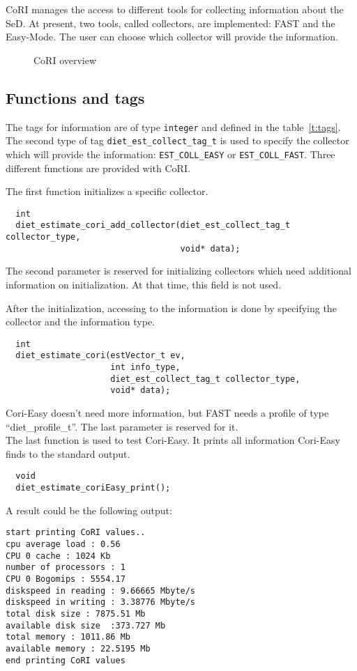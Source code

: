 CoRI manages the access to different tools for collecting information about the SeD. At present, two tools, called collectors, are implemented: FAST and the Easy-Mode. The user can choose which collector will provide the information.

\begin{figure}[h]
  \begin{center}
    \caption{CoRI overview}
    \label{fig:cori-overview}
  \end{center}
\end{figure}

\subsection{Functions and tags}
The tags for information are of type \texttt{integer} and
defined in the table~\ref{t:tags}. The second type of tag
\texttt{diet\_est\_collect\_tag\_t} is used to specify the collector
which will provide the information: \texttt{EST\_COLL\_EASY} or
\texttt{EST\_COLL\_FAST}. Three different functions are provided
with CoRI.

The first function initializes a specific collector.

\footnotesize
\begin{verbatim}
  int
  diet_estimate_cori_add_collector(diet_est_collect_tag_t collector_type,
                                   void* data);
\end{verbatim}
\normalsize
The second parameter is reserved for initializing collectors which need additional information on  initialization. At that time, this field is not used.

After the initialization, accessing to the information is done by specifying the
collector and the information type.
\footnotesize
\begin{verbatim}
  int
  diet_estimate_cori(estVector_t ev,
                     int info_type,
                     diet_est_collect_tag_t collector_type,
                     void* data);
\end{verbatim}
\normalsize 
Cori-Easy doesn't need more information, but FAST needs a
profile of type ``diet\_profile\_t''. The last
parameter is reserved for it. \\
The last function is used to test Cori-Easy. It
prints all information Cori-Easy finds to the standard output.

\footnotesize
\begin{verbatim}
  void
  diet_estimate_coriEasy_print();
\end{verbatim}
\normalsize
A result could be the following output:
\footnotesize
\begin{verbatim}
start printing CoRI values..
cpu average load : 0.56
CPU 0 cache : 1024 Kb
number of processors : 1
CPU 0 Bogomips : 5554.17
diskspeed in reading : 9.66665 Mbyte/s
diskspeed in writing : 3.38776 Mbyte/s
total disk size : 7875.51 Mb
available disk size  :373.727 Mb
total memory : 1011.86 Mb
available memory : 22.5195 Mb
end printing CoRI values
\end{verbatim}
\normalsize

